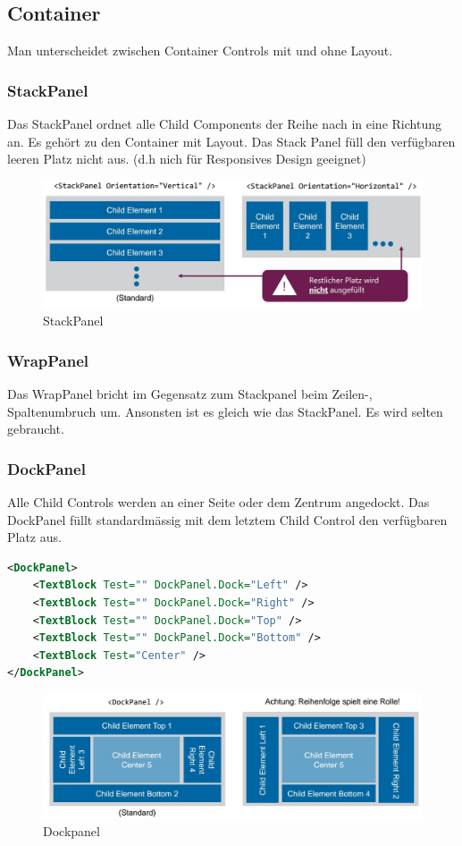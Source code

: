 
\subsection{Container}
Man unterscheidet zwischen Container Controls mit und ohne Layout.

\subsubsection{StackPanel}
Das StackPanel ordnet alle Child Components der Reihe nach in eine Richtung an. Es gehört zu den Container mit Layout. Das Stack Panel füll den verfügbaren leeren Platz nicht aus. (d.h nich für Responsives Design geeignet)
\begin{figure}[h]
\centering
\includegraphics[width=0.5\linewidth]{images/stackpanel}
\caption{StackPanel}
\label{fig:stackpanel}
\end{figure}


\subsubsection{WrapPanel}
Das WrapPanel bricht im Gegensatz zum Stackpanel beim Zeilen-, Spaltenumbruch um. Ansonsten ist es gleich wie das StackPanel. Es wird selten gebraucht.

\subsubsection{DockPanel}
Alle Child Controls werden an einer Seite oder dem Zentrum angedockt. Das DockPanel füllt standardmässig mit dem letztem Child Control den verfügbaren Platz aus.
\begin{lstlisting}[caption=Dockpanel, language=XML]
<DockPanel>
	<TextBlock Test="" DockPanel.Dock="Left" />
	<TextBlock Test="" DockPanel.Dock="Right" />
	<TextBlock Test="" DockPanel.Dock="Top" />
	<TextBlock Test="" DockPanel.Dock="Bottom" />
	<TextBlock Test="Center" />
</DockPanel>
\end{lstlisting}
\begin{figure}[h]
\centering
\includegraphics[width=0.5\linewidth]{images/dockpanel}
\caption{Dockpanel}
\label{fig:dockpanel}
\end{figure}

